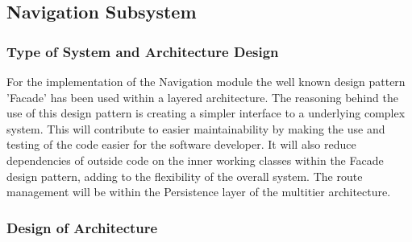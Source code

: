 \documentclass{article}
\begin{document}
 		
 		\subsection{Navigation Subsystem}
 		\subsubsection{Type of System and Architecture Design}
				For the implementation of the Navigation module the well known design pattern 'Facade' has been used within a layered architecture. The reasoning behind the use of this design pattern is creating a simpler interface to a underlying complex system. This will contribute to easier maintainability by making the use and testing of the code easier for the software developer. It will also reduce dependencies of outside code on the inner working classes within the Facade design pattern, adding to the flexibility of the overall system. The route management will be within the Persistence layer of the multitier architecture.
				
		\subsubsection{Design of Architecture}
				
\end{document}
